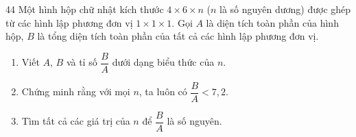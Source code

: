 \begin{probbox}{44}{}
Một hình hộp chữ nhật kích thước $4\times 6\times n$ ($n$ là số nguyên dương) được ghép từ các hình lập phương đơn vị $1\times1\times1$. Gọi $A$ là diện tích toàn phần của hình hộp, $B$ là tổng diện tích toàn phần của tất cả các hình lập phương đơn vị.
\begin{enumerate}[label=\alph*),leftmargin=1.6em,itemsep=1pt]
\item Viết $A$, $B$ và tỉ số $\dfrac{B}{A}$ dưới dạng biểu thức của $n$.
\item Chứng minh rằng với mọi $n$, ta luôn có $\dfrac{B}{A}<7{,}2$.
\item Tìm tất cả các giá trị của $n$ để $\dfrac{B}{A}$ là số nguyên.
\end{enumerate}
\end{probbox}
